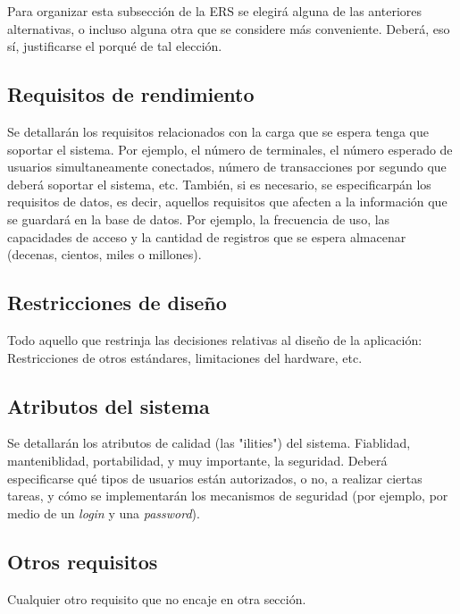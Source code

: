 \documentclass[12pt,a4paper, twosite]{article}
\begin{document}
Para organizar esta subsección de la ERS se elegirá alguna de las
anteriores alternativas, o incluso alguna otra que se considere más
conveniente. Deberá, eso sí, justificarse el porqué de tal elección.



\subsection{Requisitos de rendimiento}
\label{sec:org94bc543}

Se detallarán los requisitos relacionados con la carga que se espera
tenga que soportar el sistema. Por ejemplo, el número de terminales,
el número esperado de usuarios simultaneamente conectados, número de
transacciones por segundo que deberá soportar el sistema, etc.
  También, si es necesario, se especificarpán los requisitos de
datos, es decir, aquellos requisitos que afecten a la información
que se guardará en la base de datos. Por ejemplo, la frecuencia de
uso, las capacidades de acceso y la cantidad de registros que se
espera almacenar (decenas, cientos, miles o millones).


\subsection{Restricciones de diseño}
\label{sec:org49fe900}


Todo aquello que restrinja las decisiones relativas al diseño de la
aplicación: Restricciones de otros estándares, limitaciones del
hardware, etc.


\subsection{Atributos del sistema}
\label{sec:orgd0babc0}

Se detallarán los atributos de calidad (las "ilities") del
sistema. Fiablidad, manteniblidad, portabilidad, y muy importante,
la seguridad. Deberá especificarse qué tipos de usuarios están
autorizados, o no, a realizar ciertas tareas, y cómo se
implementarán los mecanismos de seguridad (por ejemplo, por medio de
un \emph{login} y una \emph{password}).


\subsection{Otros requisitos}
\label{sec:org31d2978}

Cualquier otro requisito que no encaje en otra sección.
\end{document}
